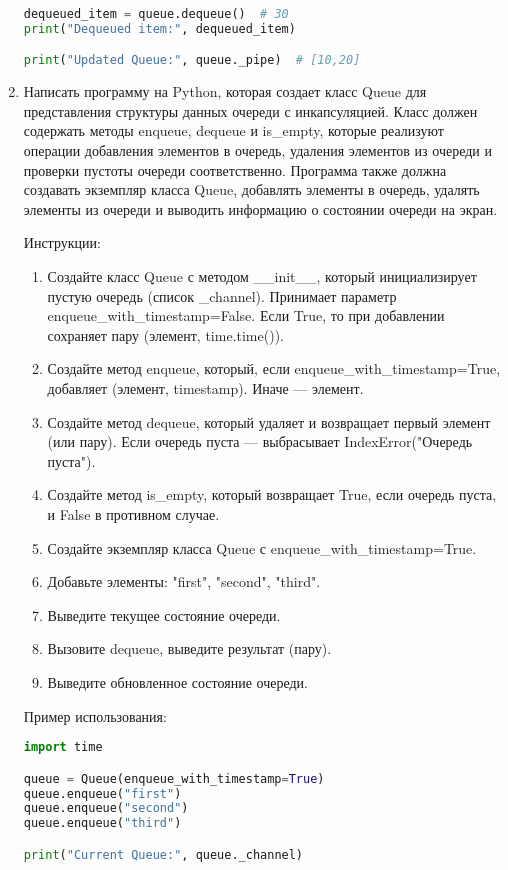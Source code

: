 \begin{enumerate}
\begin{lstlisting}[language=Python]
dequeued_item = queue.dequeue()  # 30
print("Dequeued item:", dequeued_item)

print("Updated Queue:", queue._pipe)  # [10,20]
\end{lstlisting}

\item Написать программу на Python, которая создает класс Queue для представления структуры данных очереди с инкапсуляцией. Класс должен содержать методы enqueue, dequeue и is\_empty, которые реализуют операции добавления элементов в очередь, удаления элементов из очереди и проверки пустоты очереди соответственно. Программа также должна создавать экземпляр класса Queue, добавлять элементы в очередь, удалять элементы из очереди и выводить информацию о состоянии очереди на экран.

Инструкции:
\begin{enumerate}
    \item Создайте класс Queue с методом \_\_init\_\_, который инициализирует пустую очередь (список \_channel). Принимает параметр enqueue\_with\_timestamp=False. Если True, то при добавлении сохраняет пару (элемент, time.time()).
    \item Создайте метод enqueue, который, если enqueue\_with\_timestamp=True, добавляет (элемент, timestamp). Иначе — элемент.
    \item Создайте метод dequeue, который удаляет и возвращает первый элемент (или пару). Если очередь пуста — выбрасывает IndexError("Очередь пуста").
    \item Создайте метод is\_empty, который возвращает True, если очередь пуста, и False в противном случае.
    \item Создайте экземпляр класса Queue с enqueue\_with\_timestamp=True.
    \item Добавьте элементы: "first", "second", "third".
    \item Выведите текущее состояние очереди.
    \item Вызовите dequeue, выведите результат (пару).
    \item Выведите обновленное состояние очереди.
\end{enumerate}

Пример использования:
\begin{lstlisting}[language=Python]
import time

queue = Queue(enqueue_with_timestamp=True)
queue.enqueue("first")
queue.enqueue("second")
queue.enqueue("third")

print("Current Queue:", queue._channel)


\end{lstlisting}
\end{enumerate}
